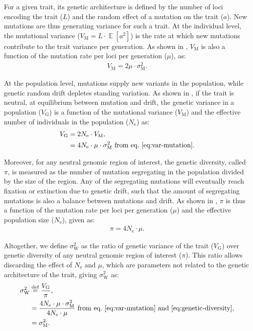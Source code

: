 \documentclass{article}
\newcommand{\defEqual}{\stackrel{\text{def}}{=}}
\newcommand{\Multiply}{\cdot}
\DeclareMathOperator{\E}{\mathbb{E}}
\newcommand{\Ne}{N_{\text{e}}}
\newcommand{\MutationRate}{\mu}
\newcommand{\NbrLoci}{L}
\newcommand{\VarGenetic}{V_{\mathrm{G}}}
\newcommand{\VarMutation}{V_{\mathrm{M}}}
\newcommand{\RateMut}{\sigma^2_{\mathrm{M}}}
\newcommand{\RatePop}{\sigma^2_{\mathrm{W}}}
\begin{document}
For a given trait, its genetic architecture is defined by the number of loci encoding the trait ($\NbrLoci$) and the random effect of a mutation on the trait ($a$).
New mutations are thus generating variance for such a trait.
At the individual level, the mutational variance ($\VarMutation = \NbrLoci \Multiply  \E [a^2]$) is the rate at which new mutations contribute to the trait variance per generation.
As shown in \textcite{lande_quantitative_1979, lande_sexual_1980}, $\VarMutation$ is also a function of the mutation rate per loci per generation ($\MutationRate$), as:
\begin{gather}
    \VarMutation = 2 \MutationRate \Multiply \RateMut \label{eq:var-mutation}.
\end{gather}

At the population level, mutations supply new variants in the population, while genetic random drift depletes standing variation.
As shown in \textcite{lynch_mutation_1998}, if the trait is neutral, at equilibrium between mutation and drift, the genetic variance in a population ($\VarGenetic$) is a function of the mutational variance ($\VarMutation$) and the effective number of individuals in the population ($\Ne$) as:
\begin{align}
    \VarGenetic & =  2 \Ne \Multiply \VarMutation, \\
    & = 4 \Ne \Multiply \MutationRate \Multiply \RateMut \text{ from eq.~\ref{eq:var-mutation}}\label{eq:var-genetic}.
\end{align}

Moreover, for any neutral genomic region of interest, the genetic diversity, called $\pi$, is measured as the number of mutation segregating in the population divided by the size of the region.
Any of the segregating mutations will eventually reach fixation or extinction due to genetic drift, such that the amount of segregating mutations is also a balance between mutations and drift.
As shown in \textcite{tajima_statistical_1989}, $\pi$ is thus a function of the mutation rate per loci per generation ($\MutationRate$) and the effective population size ($\Ne$), given as:
\begin{gather}
    \pi = 4 \Ne \Multiply \MutationRate \label{eq:genetic-diversity}.
\end{gather}

Altogether, we define $\RatePop$ as the ratio of genetic variance of the trait ($\VarGenetic$) over genetic diversity of any neutral genomic region of interest ($\pi$).
This ratio allows discarding the effect of $\Ne$ and $\MutationRate$, which are parameters not related to the genetic architecture of the trait, giving $\RatePop$ as:
\begin{align}
    \RatePop & \defEqual \frac{\VarGenetic }{\pi}, \\
    & = \frac{4 \Ne \Multiply \MutationRate \Multiply \RateMut}{4 \Ne \Multiply \MutationRate} \text{ from eq.~\ref{eq:var-mutation} and~\ref{eq:genetic-diversity}}, \\
    & = \RateMut. \label{eq:rate-pop}
\end{align}
\end{document}

